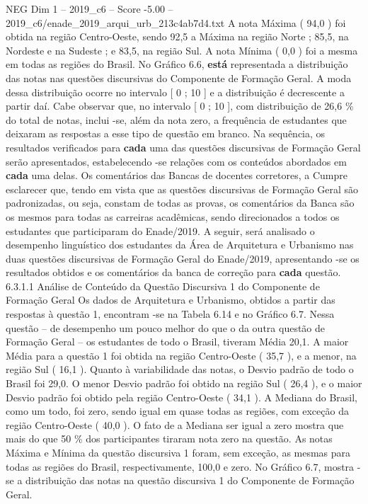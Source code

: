 \begin{textsample}{NEG Dim 1 – 2019\_c6 – Score -5.00 – 2019\_c6/enade\_2019\_arqui\_urb\_213c4ab7d4.txt}
A nota Máxima ( 94,0 ) foi obtida na região Centro-Oeste, sendo 92,5 a Máxima na região Norte ; 85,5, na Nordeste e na Sudeste ; e 83,5, na região Sul.
A nota Mínima ( 0,0 ) foi a mesma em todas as regiões do Brasil.
No Gráfico 6.6, \textbf{está} representada a distribuição das notas nas questões discursivas do Componente de Formação Geral.
A moda dessa distribuição ocorre no intervalo [ 0 ; 10 ] e a distribuição é decrescente a partir daí.
Cabe observar que, no intervalo [ 0 ; 10 ], com distribuição de 26,6 \% do total de notas, inclui -se, além da nota zero, a frequência de estudantes que deixaram as respostas a esse tipo de questão em branco.
Na sequência, os resultados verificados para \textbf{cada} uma das questões discursivas de Formação Geral serão apresentados, estabelecendo -se relações com os conteúdos abordados em \textbf{cada} uma delas.
Os comentários das Bancas de docentes corretores, a Cumpre esclarecer que, tendo em vista que as questões discursivas de Formação Geral são padronizadas, ou seja, constam de todas as provas, os comentários da Banca são os mesmos para todas as carreiras acadêmicas, sendo direcionados a todos os estudantes que participaram do Enade/2019.
A seguir, será analisado o desempenho linguístico dos estudantes da Área de Arquitetura e Urbanismo nas duas questões discursivas de Formação Geral do Enade/2019, apresentando -se os resultados obtidos e os comentários da banca de correção para \textbf{cada} questão. 6.3.1.1 Análise de Conteúdo da Questão Discursiva 1 do Componente de Formação Geral Os dados de Arquitetura e Urbanismo, obtidos a partir das respostas à questão 1, encontram -se na Tabela 6.14 e no Gráfico 6.7.
Nessa questão – de desempenho um pouco melhor do que o da outra questão de Formação Geral – os estudantes de todo o Brasil, tiveram Média 20,1.
A maior Média para a questão 1 foi obtida na região Centro-Oeste ( 35,7 ), e a menor, na região Sul ( 16,1 ).
Quanto à variabilidade das notas, o Desvio padrão de todo o Brasil foi 29,0.
O menor Desvio padrão foi obtido na região Sul ( 26,4 ), e o maior Desvio padrão foi obtido pela região Centro-Oeste ( 34,1 ).
A Mediana do Brasil, como um todo, foi zero, sendo igual em quase todas as regiões, com exceção da região Centro-Oeste ( 40,0 ).
O fato de a Mediana ser igual a zero mostra que mais do que 50 \% dos participantes tiraram nota zero na questão.
As notas Máxima e Mínima da questão discursiva 1 foram, sem exceção, as mesmas para todas as regiões do Brasil, respectivamente, 100,0 e zero.
No Gráfico 6.7, mostra -se a distribuição das notas na questão discursiva 1 do Componente de Formação Geral.

\end{textsample}
